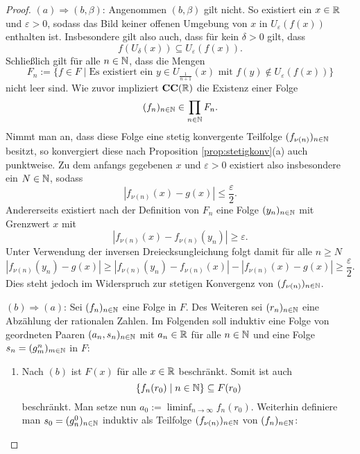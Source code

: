 \begin{proof}
  $(a) \Rightarrow (b,\beta)$:
  Angenommen $(b, \beta)$ gilt nicht.
  So existiert ein $x \in \mathbb{R}$ und $\varepsilon > 0$, sodass das Bild keiner offenen Umgebung von $x$ in $U_\varepsilon(f(x))$ enthalten ist.
  Insbesondere gilt also auch, dass für kein $\delta > 0$ gilt, dass
  \begin{displaymath}
    f(U_\delta(x)) \subseteq U_\varepsilon(f(x)).
  \end{displaymath}
  Schließlich gilt für alle $n \in \mathbb{N}$, dass die Mengen
  \begin{displaymath}
    F_n := \{ f \in F \mid \text{Es existiert ein } y \in U_{\frac{1}{n+1}}(x) \text{ mit } f(y) \not\in U_\varepsilon(f(x)) \}
  \end{displaymath}
  nicht leer sind.
  Wie zuvor impliziert $\mathbf{CC}(\mathbb{R})$ die Existenz einer Folge 
  \begin{displaymath}
    (f_n)_{n \in \mathbb{N}} \in \prod_{n \in \mathbb{N}} F_n.
  \end{displaymath}
  Nimmt man an, dass diese Folge eine stetig konvergente Teilfolge $(f_{\nu(n)})_{n \in \mathbb{N}}$ besitzt, so konvergiert diese nach Proposition \ref{prop:stetigkonv}(a) auch punktweise.
  Zu dem anfangs gegebenen $x$ und $\varepsilon > 0$ existiert also insbesondere ein $N \in \mathbb{N}$, sodass
  \begin{displaymath}
    | f_{\nu(n)}(x) - g(x) | \leq \frac{\varepsilon}{2}.
  \end{displaymath}
  Andererseits existiert nach der Definition von $F_n$ eine Folge $(y_n)_{n \in \mathbb{N}}$ mit Grenzwert $x$ mit 
  \begin{displaymath}
    | f_{\nu(n)}(x) -  f_{\nu(n)}(y_n) | \geq \varepsilon.
  \end{displaymath}
  Unter Verwendung der inversen Dreiecksungleichung folgt damit für alle $n \geq N$
  \begin{displaymath}
    | f_{\nu(n)}(y_n) - g(x) | 
    \geq 
    | f_{\nu(n)}(y_n) - f_{\nu(n)}(x) | - | f_{\nu(n)}(x) - g(x)  | 
    \geq \frac{\varepsilon}{2}.
  \end{displaymath}
  Dies steht jedoch im Widerspruch zur stetigen Konvergenz von $(f_{\nu(n)})_{n \in \mathbb{N}}$.

  $(b) \Rightarrow (a)$:
  Sei $(f_n)_{n \in \mathbb{N}}$ eine Folge in $F$.
  Des Weiteren sei $(r_n)_{n \in \mathbb{N}}$ eine Abzählung der rationalen Zahlen.
  Im Folgenden soll induktiv eine Folge von geordneten Paaren $(a_n, s_n)_{n \in \mathbb{N}}$ mit $a_n \in \mathbb{R}$ für alle $n \in \mathbb{N}$ und eine Folge $s_n = (g_m^n)_{m \in \mathbb{N}}$ in $F$:
  \begin{enumerate}
    \item 
      Nach $(b)$ ist $F(x)$ für alle $x \in \mathbb{R}$ beschränkt. 
      Somit ist auch 
      \begin{displaymath}
        \{f_n(r_0) \mid n \in \mathbb{N}\} \subseteq F(r_0)
      \end{displaymath}
      beschränkt.
      Man setze nun $a_0 := \liminf_{n \to \infty} f_n(r_0)$.
      Weiterhin definiere man $s_0 = (g_n^0)_{n \in \mathbb{N}}$ induktiv als Teilfolge $(f_{\nu(n)})_{n \in \mathbb{N}}$ von $(f_n)_{n \in \mathbb{N}}$:
      \begin{itemize}


\end{itemize}
\end{enumerate}
\end{proof}
